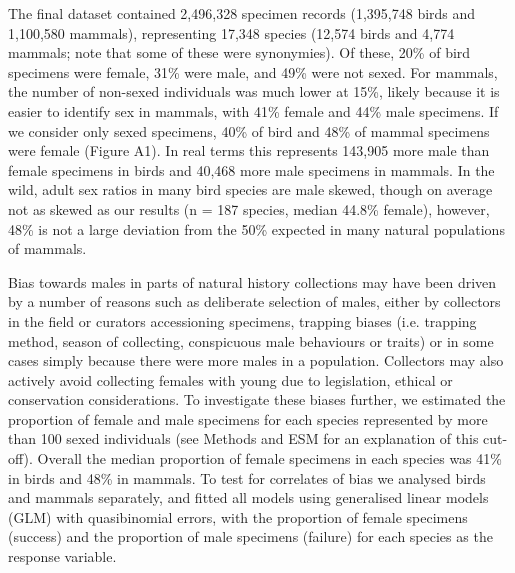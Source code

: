 \documentclass[a4paper, 12pt]{article}
\begin{document}
The final dataset contained 2,496,328 specimen records (1,395,748 birds and 1,100,580 mammals), representing 17,348 species (12,574 birds and 4,774 mammals; note that some of these were synonymies). 
Of these, 20\% of bird specimens were female, 31\% were male, and 49\% were not sexed. 
For mammals, the number of non-sexed individuals was much lower at 15\%, likely because it is easier to identify sex in mammals, with 41\% female and 44\% male specimens. 
If we consider only sexed specimens, 40\% of bird and 48\% of mammal specimens were female (Figure A1). 
In real terms this represents 143,905 more male than female specimens in birds and 40,468 more male specimens in mammals. 
In the wild, adult sex ratios in many bird species are male skewed, though on average not as skewed as our results (n = 187 species, median 44.8\% female\cite{szekely2014sex}), however, 48\% is not a large deviation from the 50\% expected in many natural populations of mammals\cite{karlin1986theoretical}.

Bias towards males in parts of natural history collections may have been driven by a number of reasons such as deliberate selection of males, either by collectors in the field or curators accessioning specimens, trapping biases (i.e. trapping method, season of collecting, conspicuous male behaviours or traits) or in some cases simply because there were more males in a population. 
Collectors may also actively avoid collecting females with young due to legislation, ethical or conservation considerations. 
To investigate these biases further, we estimated the proportion of female and male specimens for each species represented by more than 100 sexed individuals (see Methods and ESM for an explanation of this cut-off). 
Overall the median proportion of female specimens in each species was 41\% in birds and 48\% in mammals. 
To test for correlates of bias we analysed birds and mammals separately, and fitted all models using generalised linear models (GLM) with quasibinomial errors, with the proportion of female specimens (success) and the proportion of male specimens (failure) for each species as the response variable.
\end{document}
